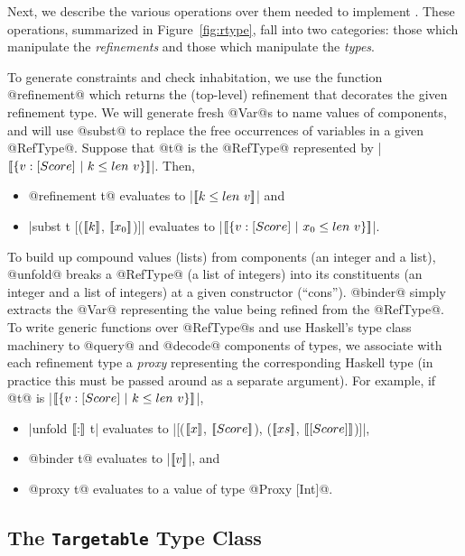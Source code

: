 Next, we describe the various operations over them 
needed to implement \toolname.
These operations, summarized in Figure~\ref{fig:rtype}, 
fall into two categories: those which manipulate the 
\emph{refinements} and those which manipulate the 
\emph{types}.

To generate constraints and check inhabitation, we use 
the function @refinement@ which returns the (top-level) refinement
that decorates the given refinement type.
%
We will generate fresh @Var@s to name values of components, and will 
use @subst@ to replace the free occurrences of variables in a given \hbox{@RefType@.}
%
Suppose that @t@ is the @RefType@ represented by
\hbox{|$\meta{\reft{v}{[Score]}{k \leq len\ v}}$|.} Then,
%
\begin{itemize}
\item{@refinement t@} evaluates to |$[\![k \leq len\ v]\!]$| and
\item{|subst t [($[\![k]\!]$, $[\![x_0]\!]$)]|} evaluates to |$\meta{\reft{v}{[Score]}{x_0 \leq len\ v}}$|.
\end{itemize}

To build up compound values (\eg lists) from components 
(\eg an integer and a list), 
%
@unfold@ breaks a @RefType@ (\eg a list of integers) into its 
constituents (\eg an integer and a list of integers) at a given 
constructor (\eg ``cons'').
%
@binder@ simply extracts the @Var@ representing the
value being refined from the \hbox{@RefType@.}
%
To write generic functions over @RefType@s and use Haskell's
type class machinery to @query@ and @decode@ components of
types, we associate with each refinement type a \emph{proxy}
representing the corresponding Haskell type (in practice
this must be passed around as a separate argument).
%
For example, if @t@ is \hbox{|$\meta{\reft{v}{[Score]}{k \leq len\ v}}$|,} 
%
\begin{itemize}
\item{|unfold $[\![:]\!]$ t|} evaluates to |[($[\![x]\!]$, $[\![Score]\!]$), ($[\![xs]\!]$, $[\![[Score]]\!]$)]|,
\item{@binder t@} evaluates to |$[\![v]\!]$|, and
\item{@proxy t@} evaluates to a value of type @Proxy [Int]@.
\end{itemize}

\subsection{The \texttt{Targetable} Type Class}\label{sec:targetable}


